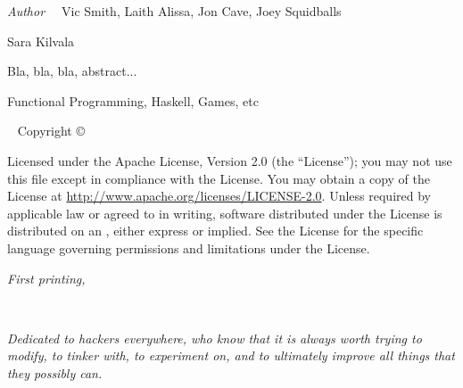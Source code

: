 \newpage
\begin{fullwidth}
	{\large {\it Author\ \ } Vic Smith, Laith Alissa, Jon Cave, Joey Squidballs
	
	\vspace{1em} Sara Kilvala
	
	\vspace{1em} Bla, bla, bla, abstract...
	
	\vspace{1em} Functional Programming, Haskell, Games, etc
	
	}
	
	~\vfill
	\thispagestyle{empty}
	\setlength{\parindent}{0pt}
	\setlength{\parskip}{\baselineskip}
	Copyright \copyright\ \the\year\ \thanklessauthor
	
	\par{}
	
	
	\par Licensed under the Apache License, Version 2.0 (the ``License''); you may not
	use this file except in compliance with the License. You may obtain a copy
	of the License at \url{http://www.apache.org/licenses/LICENSE-2.0}. Unless
	required by applicable law or agreed to in writing, software distributed
	under the License is distributed on an , either express or implied. See the
	License for the specific language governing permissions and limitations
	under the License.
	
	\par\textit{First printing, \monthyear}


\tableofcontents

\end{fullwidth}



\cleardoublepage
~\vfill
\begin{doublespace}
\noindent\fontsize{18}{22}\selectfont\itshape
\nohyphenation
Dedicated to hackers everywhere, who know that it is always worth trying to modify, to tinker with, to experiment on, and to ultimately improve all things that they possibly can.
\end{doublespace}
\vfill
\vfill


